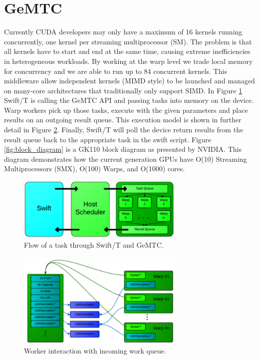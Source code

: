 \documentclass[conference]{IEEEtran}
\begin{document}
\section{GeMTC}

Currently CUDA developers may only have a maximum of 16 kernels running concurrently, one kernel per streaming multiprocessor (SM). The problem is that all kernels have to start and end at the same time, causing extreme inefficiencies in heterogeneous workloads. By working at the warp level we trade local memory for concurrency and we are able to run up to 84 concurrent kernels. \cite{kriederSC12} This middleware allow independent kernels (MIMD style) to be launched and managed on many-core architectures that traditionally only support SIMD. \cite{kriederXSEDE12} In Figure \ref{fig:big_pic} Swift/T is calling the GeMTC API and passing tasks into memory on the device. Warp workers pick up those tasks, execute with the given parameters and place results on an outgoing result queue. This execution model is shown in further detail in Figure \ref{fig:warps}. Finally, Swift/T will poll the device return results from the result queue back to the appropriate task in the swift script. Figure \ref{fig:block_diagram} is a  GK110 block diagram as presented by NVIDIA. \cite{GK110} This diagram demonstrates how the current generation GPUs have O(10) Streaming Multiprocessors (SMX), O(100) Warps, and O(1000) cores.
\begin{figure}[h]
\centering\includegraphics[width=8cm]{imgs/big_picture.png}
\caption{Flow of a task through Swift/T and GeMTC.}
\label{fig:big_pic}
\end{figure}

\begin{figure}[h]
\centering\includegraphics[width=8cm]{imgs/warps.png}
\caption{Worker interaction with incoming work queue.}
\label{fig:warps}
\end{figure}
\end{document}
